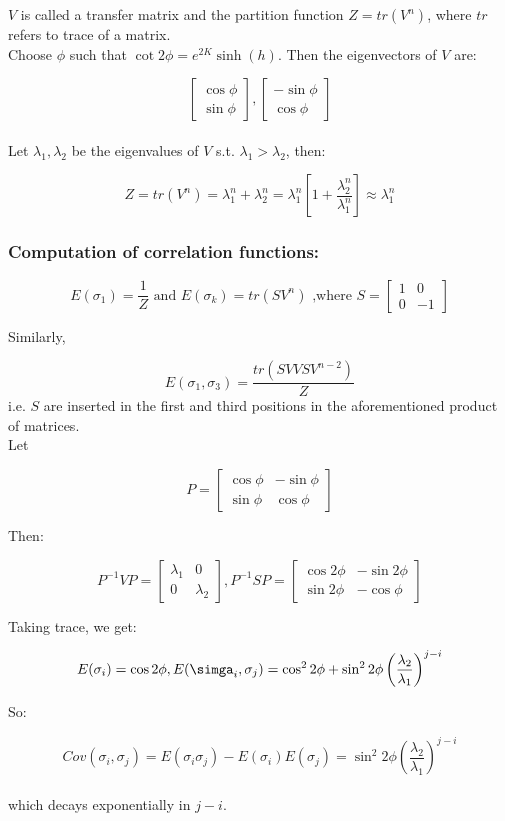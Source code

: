 \documentclass{article}
\begin{document}
$V$ is called a transfer matrix and the partition function $Z = tr(V^n)$, where $tr$ refers to trace of a matrix.\\

Choose $\phi$ such that $\cot 2\phi = e^{2K}\sinh (h)$. Then the eigenvectors of $V$ are:

$$\begin{bmatrix} \cos \phi \\ \sin \phi\end{bmatrix},\begin{bmatrix} -\sin \phi \\ \cos \phi\end{bmatrix}$$ \\

Let $\lambda_1,\lambda_2$ be the eigenvalues of $V$ s.t. $\lambda_1>\lambda_2$, then:

$$Z = tr(V^n) = \lambda_1^n+\lambda_2^n = \lambda_1^n\left[ 1+\frac{\lambda_2^n}{\lambda_1^n} \right]\approx \lambda_1^n$$

\subsubsection{Computation of correlation functions:}
$$E(\sigma_1) = \frac{1}{Z}\text{ and } E(\sigma_k) = tr(SV^n)\text{ ,where } S = \begin{bmatrix} 1 & 0 \\ 0 & -1 \end{bmatrix} $$

Similarly, 

$$E(\sigma_1,\sigma_3) = \frac{tr(SVVSV^{n-2})}{Z}$$ i.e. $S$ are inserted in the first and third positions in the aforementioned product of matrices. \\

Let

$$P = \begin{bmatrix} \cos \phi & -\sin \phi \\ \sin \phi & \cos \phi \end{bmatrix}$$

Then:

$$P^{-1}VP = \begin{bmatrix} \lambda_1 & 0 \\ 0 & \lambda_2 \end{bmatrix} , P^{-1}SP = \begin{bmatrix} \cos 2\phi & -\sin 2\phi \\ \sin 2\phi & -\cos \phi \end{bmatrix}$$

Taking trace, we get:

$$E(\sigma_i) = \cos 2\phi, E(\simga_i,\sigma_j) = \cos^2 2\phi + \sin^2 2\phi\left( \frac{\lambda_2}{\lambda_1} \right)^{j-i}$$

So:

$$Cov(\sigma_i,\sigma_j) = E(\sigma_i\sigma_j)-E(\sigma_i)E(\sigma_j) = \sin^2 2\phi \left( \frac{\lambda_2}{\lambda_1} \right)^{j-i}$$ \\

which decays exponentially in $j-i$.
\end{document}
